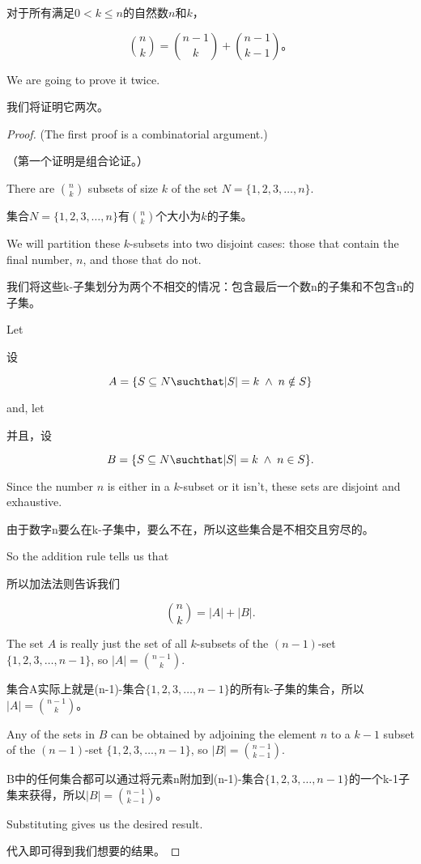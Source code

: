 \begin{thm}
对于所有满足$0 < k \leq n$的自然数$n$和$k$，

\[ \binom{n}{k} = \binom{n-1}{k} + \binom{n-1}{k-1}。\]
\end{thm}

We are going to prove it twice.

我们将证明它两次。

\begin{proof} 
(The first proof is a combinatorial argument.)

（第一个证明是组合论证。）

There are $\binom{n}{k}$ subsets of size $k$ of the set $N = \{1, 2, 3, \ldots, n\}$.

集合$N = \{1, 2, 3, \ldots, n\}$有$\binom{n}{k}$个大小为$k$的子集。

We will partition these $k$-subsets into two disjoint cases: those that contain
the final number, $n$, and those that do not.

我们将这些k-子集划分为两个不相交的情况：包含最后一个数n的子集和不包含n的子集。

Let 

设

\[ A = \{ S \subseteq N \suchthat |S| = k \; \land \; n \notin S \} \]

\noindent and, let

\noindent 并且，设

\[ B = \{ S \subseteq N \suchthat |S| = k \; \land \; n \in S \}. \]

Since the number $n$ is either in a $k$-subset or it isn't, these sets
are disjoint and exhaustive.

由于数字n要么在k-子集中，要么不在，所以这些集合是不相交且穷尽的。

So the addition rule tells us that

所以加法法则告诉我们

\[ \binom{n}{k} = |A| + |B|. \]

The set $A$ is really just the set of all $k$-subsets of the $(n-1)$-set
$\{1, 2, 3, \ldots, n-1 \}$, so $|A| = \binom{n-1}{k}$.

集合A实际上就是(n-1)-集合$\{1, 2, 3, \ldots, n-1 \}$的所有k-子集的集合，所以$|A| = \binom{n-1}{k}$。

Any of the sets in $B$ can be obtained by adjoining the element $n$ to
a $k-1$ subset of the  $(n-1)$-set
$\{1, 2, 3, \ldots, n-1 \}$, so $|B| = \binom{n-1}{k-1}$.

B中的任何集合都可以通过将元素n附加到(n-1)-集合$\{1, 2, 3, \ldots, n-1 \}$的一个k-1子集来获得，所以$|B| = \binom{n-1}{k-1}$。

Substituting gives us the desired result.

代入即可得到我们想要的结果。
\end{proof}


